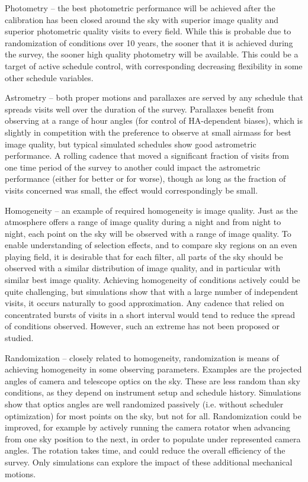 \begin{description}

\item{Photometry} -- the best photometric performance will be achieved
after the calibration has been closed around the sky with superior image
quality and superior photometric quality visits to every field.  While
this is probable due to randomization of conditions over 10 years, the
sooner that it is achieved during the survey, the sooner high quality
photometry will be available.  This could be a target of active schedule
control, with corresponding decreasing flexibility in some other
schedule variables.

\item{Astrometry} -- both proper motions and parallaxes are served by
any schedule that spreads visits well over the duration of the survey.
Parallaxes benefit from observing at a range of hour angles (for control of HA-dependent biases),
which is slightly in competition with the preference to observe at small airmass
for best image quality, but typical simulated schedules show good
astrometric performance. A rolling cadence that moved a significant
fraction of visits from one time period of the survey to another could
impact the astrometric performance (either for better or for worse),
though as long as the fraction of visits concerned was small, the effect
would correspondingly be small.

\item{Homogeneity} -- an  example of required homogeneity is image
quality. Just as the atmosphere offers a range of image quality during a
night and from night to night, each point on the sky will be observed
with a range of image quality.  To enable understanding of selection
effects, and to compare sky regions on an even playing field, it is
desirable that for each filter, all parts of the sky should be observed
with a similar distribution of image quality, and in particular with
similar best image quality. Achieving homogeneity of conditions actively
could be quite challenging, but simulations show that with a large
number of independent visits, it occurs naturally to good approximation.
Any cadence that relied on concentrated bursts of visits in a short
interval would tend to reduce the spread of conditions observed.
However, such an extreme has not been proposed or studied.

\item{Randomization} -- closely related to homogeneity, randomization is
means of achieving homogeneity in some observing parameters.  Examples
are the projected angles of camera and telescope optics on the sky.
These are less random than sky conditions, as they depend on instrument
setup and schedule history.  Simulations show that optics angles are
well randomized passively (i.e. without scheduler optimization) for most
points on the sky, but not for all.  Randomization could be improved,
for example by actively running the camera rotator when advancing from
one sky position to the next, in order to populate under represented
camera angles. The rotation takes time, and could reduce the overall
efficiency of the survey.  Only simulations can explore the impact of
these additional mechanical motions.


\end{description}
